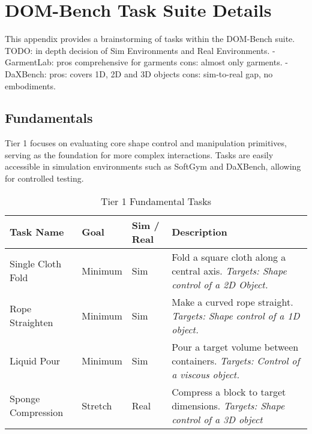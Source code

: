 \section{DOM-Bench Task Suite Details}
\label{app:task_suite} %

This appendix provides a brainstorming of tasks within the DOM-Bench suite.
TODO: in depth decision of Sim Environments and Real Environments.
- GarmentLab: pros comprehensive for garments cons: almost only garments.
- DaXBench: pros: covers 1D, 2D and 3D objects cons: sim-to-real gap, no embodiments.

\subsection{Fundamentals}
\label{app:task_suite_1}

Tier 1 focuses on evaluating core shape control and manipulation primitives, serving as the foundation for more complex interactions. Tasks are easily accessible in simulation 
environments such as SoftGym and DaXBench, allowing for controlled testing.

\begin{table}[h]
\centering
\begin{tabular}{|p{3.5cm}|p{2cm}|p{2cm}|p{7.5cm}|}
\hline
\textbf{Task Name} & \textbf{Goal} & \textbf{Sim / Real} & \textbf{Description} \\
\hline
Single Cloth Fold & Minimum & Sim & Fold a square cloth along a central axis. \textit{Targets: Shape control of a 2D Object. } \\ %
\hline
Rope Straighten & Minimum & Sim & Make a curved rope straight. \textit{Targets: Shape control of a 1D object.} \\ %
\hline 
Liquid Pour & Minimum & Sim & Pour a target volume between containers. \textit{Targets: Control of a viscous object.} \\ %
\hline
Sponge Compression & Stretch  & Real & Compress a block to target dimensions. \textit{Targets: Shape control of a 3D object} \\ %
\hline
\end{tabular}
\caption{Tier 1 Fundamental Tasks}
\end{table}

